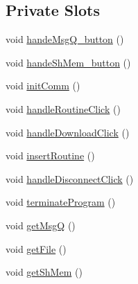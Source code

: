 \subsection*{Private Slots}
\begin{DoxyCompactItemize}
\item 
void \mbox{\hyperlink{class_main_window_a70df7ecf71e55431b4cdaee7c023b6b8}{hande\+Msg\+Q\+\_\+button}} ()
\item 
void \mbox{\hyperlink{class_main_window_a9edd35d94300c8e7ee118517848d2675}{hande\+Sh\+Mem\+\_\+button}} ()
\item 
void \mbox{\hyperlink{class_main_window_a3ae7677276119857e128f826c8b069c8}{init\+Comm}} ()
\item 
void \mbox{\hyperlink{class_main_window_abd7dc3af4e03fd257fcac427474ceeff}{handle\+Routine\+Click}} ()
\item 
void \mbox{\hyperlink{class_main_window_a19632dc3a31d674e845e237576bf8191}{handle\+Download\+Click}} ()
\item 
void \mbox{\hyperlink{class_main_window_a88b30e72fd13b54ddef7bf6e2bb08448}{insert\+Routine}} ()
\item 
void \mbox{\hyperlink{class_main_window_a9fab898ff6721d7811511a98e75150d6}{handle\+Disconnect\+Click}} ()
\item 
void \mbox{\hyperlink{class_main_window_aab2fed34f5ba1468a0c9ff35fcd79757}{terminate\+Program}} ()
\item 
void \mbox{\hyperlink{class_main_window_af0e609b7bacc38e1f25151a55b589222}{get\+MsgQ}} ()
\item 
void \mbox{\hyperlink{class_main_window_ae312fe1c0640df073ef40d7fbab3e1f9}{get\+File}} ()
\item 
void \mbox{\hyperlink{class_main_window_a707b068e9373c76cbb4d844b15d4b509}{get\+Sh\+Mem}} ()
\end{DoxyCompactItemize}
